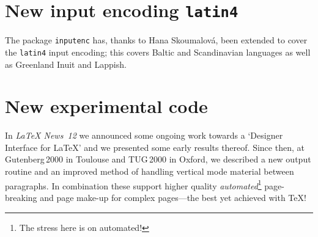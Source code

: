 \documentclass{ltnews}
\providecommand\pkg[1]{\texttt{#1}}
\providecommand\option[1]{\texttt{#1}}
\begin{document}
\section{New input encoding \texttt{latin4}}

The package \pkg{inputenc} has, thanks to Hana Skoumalov\'a,
been extended to cover the \option{latin4} input encoding; this
covers Baltic and Scandinavian languages as well as Greenland
Inuit and Lappish.

\section{New experimental code}

In \textit{\LaTeX{} News~12} we announced some ongoing work towards a
`Designer Interface for \LaTeX' and we presented some early results
thereof.  Since then, at Gutenberg\,2000 in Toulouse and TUG\,2000 in
Oxford, we described a new output routine and an improved method of
handling vertical mode material between paragraphs.  In combination
these support higher quality \emph{automated}\footnote
                             {The stress here is on automated!}
page-breaking and page make-up\latex{\\}
for complex pages---the best yet achieved with \TeX{}!
\end{document}
